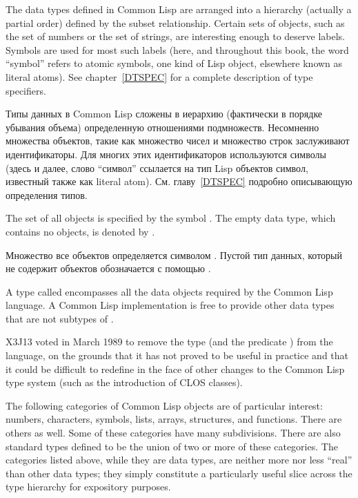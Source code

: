 The data types defined in Common Lisp are arranged into a hierarchy (actually
a partial order) defined by the subset relationship.
Certain sets of objects, such as the set of numbers or the
set of strings, are interesting enough to deserve labels.
Symbols are used for most
such labels (here, and throughout this book, the word ``symbol''
refers to atomic symbols, one kind of Lisp object,
elsewhere known as literal atoms).  See chapter~\ref{DTSPEC}
for a complete description of type specifiers.

Типы данных в Common Lisp сложены в иерархию (фактически в порядке
убывания объема) определенную отношениями подмножеств. Несомненно
множества объектов, такие как множество чисел и множество строк
заслуживают идентификаторы. Для многих этих идентификаторов
используются символы (здесь и далее, слово ``символ'' ссылается на
тип Lisp объектов символ, известный также как literal
atom). См. главу~\ref{DTSPEC} подробно описывающую определения
типов. 

The set of all objects is specified
by the symbol {\true}.  The empty data type, which contains no objects, is
denoted by {\nil}.

Множество все объектов определяется символом {\true}. Пустой тип
данных, который не содержит объектов обозначается с помощью
{\nil}. 

\begin{obsolete}
A type called  encompasses all the data
objects required by the Common Lisp language.  A Common Lisp implementation
is free to provide other data types that are not subtypes of .
\end{obsolete}

\begin{newer}
X3J13 voted in March 1989
to remove the type  (and the predicate )
from the language, on the grounds that it has
not proved to be useful in practice and that it could be difficult to redefine in the
face of other changes to the Common Lisp type system (such as the introduction
of CLOS classes).
\end{newer}

The following categories of Common Lisp objects are of particular interest:
numbers, characters, symbols, lists, arrays, structures, and functions.
There are others as well.
Some of these categories
have many subdivisions.  There are also standard types defined to
be the union
of two or more of these categories.  The categories listed above, while they
are data types, are neither more nor less ``real'' than other data types;
they simply constitute a particularly useful slice across
the type hierarchy for expository purposes.

